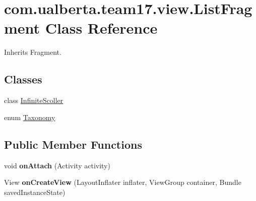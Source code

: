 \hypertarget{classcom_1_1ualberta_1_1team17_1_1view_1_1_list_fragment}{\section{com.\+ualberta.\+team17.\+view.\+List\+Fragment Class Reference}
\label{classcom_1_1ualberta_1_1team17_1_1view_1_1_list_fragment}
}


Inherits Fragment.

\subsection*{Classes}
\begin{DoxyCompactItemize}
\item 
class \hyperlink{classcom_1_1ualberta_1_1team17_1_1view_1_1_list_fragment_1_1_infinite_scoller}{Infinite\+Scoller}
\item 
enum \hyperlink{enumcom_1_1ualberta_1_1team17_1_1view_1_1_list_fragment_1_1_taxonomy}{Taxonomy}
\end{DoxyCompactItemize}
\subsection*{Public Member Functions}
\begin{DoxyCompactItemize}
\item 
\hypertarget{classcom_1_1ualberta_1_1team17_1_1view_1_1_list_fragment_a2333a100bf6a32e583c307699f796343}{void {\bfseries on\+Attach} (Activity activity)}\label{classcom_1_1ualberta_1_1team17_1_1view_1_1_list_fragment_a2333a100bf6a32e583c307699f796343}

\item 
\hypertarget{classcom_1_1ualberta_1_1team17_1_1view_1_1_list_fragment_a0bfb2e8237d49280d2ff3db66e1ddb3f}{View {\bfseries on\+Create\+View} (Layout\+Inflater inflater, View\+Group container, Bundle saved\+Instance\+State)}\label{classcom_1_1ualberta_1_1team17_1_1view_1_1_list_fragment_a0bfb2e8237d49280d2ff3db66e1ddb3f}

\end{DoxyCompactItemize}
